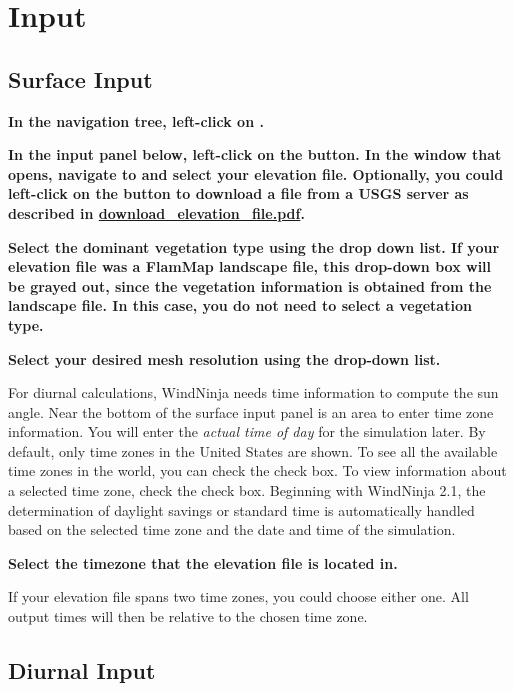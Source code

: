 \documentclass[12pt]{article}
\begin{document}
\section{Input}
\subsection{Surface Input}

\textbf{\color{red}In the navigation tree, left-click on .}

\textbf{\color{red}In the input panel below, left-click on the  button.  
In the window that opens, navigate to and select your elevation file.  
Optionally, you could left-click on the  button to download a file from a USGS server as described in \href{https://weather.firelab.org/windninja/tutorials/fetch_dem_instructions.pdf}{download\_elevation\_file.pdf}.}

\textbf{\color{red}Select the dominant vegetation type using the  drop down list.  
If your elevation file was a FlamMap landscape file, this drop-down box will be grayed out, since the vegetation information is obtained from the landscape file.  
In this case, you do not need to select a vegetation type.}

\textbf{\color{red}Select your desired mesh resolution using the  drop-down list.}

For diurnal calculations, WindNinja needs time information to compute the sun angle. 
Near the bottom of the surface input panel is an area to enter time zone information.  
You will enter the \textit{actual time of day} for the simulation later.  
By default, only time zones in the United States are shown.  
To see all the available time zones in the world, you can check the  check box.  
To view information about a selected time zone, check the  check box.  
Beginning with WindNinja 2.1, the determination of daylight savings or standard time is automatically handled based on the selected time zone and the date and time of the simulation.

\textbf{\color{red} Select the timezone that the elevation file is located in.}

If your elevation file spans two time zones, you could choose either one.  
All output times will then be relative to the chosen time zone.

\subsection{Diurnal Input}
\end{document}
